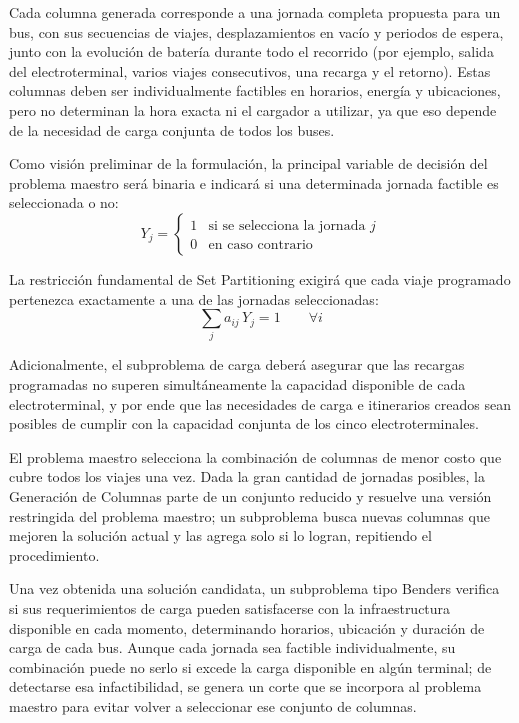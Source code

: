 Cada columna generada corresponde a una jornada completa propuesta para un bus, con sus secuencias de viajes, desplazamientos en vac\'io y periodos de espera, junto con la evoluci\'on de bater\'ia durante todo el recorrido (por ejemplo, salida del electroterminal, varios viajes consecutivos, una recarga y el retorno). Estas columnas deben ser individualmente factibles en horarios, energ\'ia y ubicaciones, pero no determinan la hora exacta ni el cargador a utilizar, ya que eso depende de la necesidad de carga conjunta de todos los buses.

Como visi\'on preliminar de la formulaci\'on, la principal variable de decisi\'on del problema maestro ser\'a binaria e indicar\'a si una determinada jornada factible es seleccionada o no:
\begin{equation}
Y_j = \begin{cases} 1 & \text{si se selecciona la jornada } j \\ 0 & \text{en caso contrario} \end{cases}
\label{eq:variabley}
\end{equation}

La restricci\'on fundamental de Set Partitioning exigir\'a que cada viaje programado pertenezca exactamente a una de las jornadas seleccionadas:
\begin{equation}
\sum_{j} a_{ij}\, Y_j = 1 \qquad \forall i
\label{eq:setpartitioning}
\end{equation}

Adicionalmente, el subproblema de carga deber\'a asegurar que las recargas programadas no superen simult\'aneamente la capacidad disponible de cada electroterminal, y por ende que las necesidades de carga e itinerarios creados sean posibles de cumplir con la capacidad conjunta de los cinco electroterminales.

El problema maestro selecciona la combinaci\'on de columnas de menor costo que cubre todos los viajes una vez. Dada la gran cantidad de jornadas posibles, la Generaci\'on de Columnas parte de un conjunto reducido y resuelve una versi\'on restringida del problema maestro; un subproblema busca nuevas columnas que mejoren la soluci\'on actual y las agrega solo si lo logran, repitiendo el procedimiento.

Una vez obtenida una soluci\'on candidata, un subproblema tipo Benders verifica si sus requerimientos de carga pueden satisfacerse con la infraestructura disponible en cada momento, determinando horarios, ubicaci\'on y duraci\'on de carga de cada bus. Aunque cada jornada sea factible individualmente, su combinaci\'on puede no serlo si excede la carga disponible en algún terminal; de detectarse esa infactibilidad, se genera un corte que se incorpora al problema maestro para evitar volver a seleccionar ese conjunto de columnas.

